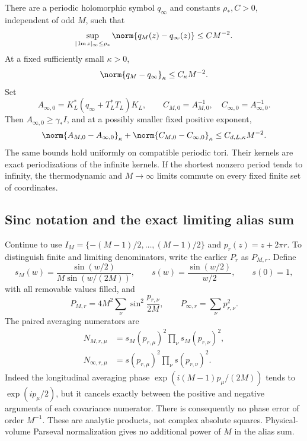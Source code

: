 \begin{theorem}\label{limit-theorem}
There are a periodic holomorphic symbol $q_\infty$ and constants
$\rho_*,C>0$, independent of odd $M$, such that
\begin{equation}\label{limit-symbol-rate}
 \sup_{|\operatorname{Im}z|_\infty\le\rho_*}
       \norm{q_M(z)-q_\infty(z)}\le CM^{-2}.
\end{equation}
At a fixed sufficiently small $\kappa>0$,
\begin{equation}\label{limit-action-rate}
 \norm{q_M-q_\infty}_\kappa\le C_\kappa M^{-2}.
\end{equation}
Set
\[
 A_{\infty,0}=K_L^*(q_\infty+T_L^*T_L)K_L,
 \qquad C_{M,0}=A_{M,0}^{-1},\quad
 C_{\infty,0}=A_{\infty,0}^{-1}.
\]
Then $A_{\infty,0}\ge\gamma_*I$, and at a possibly smaller fixed
positive exponent,
\begin{equation}\label{limit-covariance-rate}
 \norm{A_{M,0}-A_{\infty,0}}_\kappa+
 \norm{C_{M,0}-C_{\infty,0}}_\kappa
 \le C_{d,L,\kappa}M^{-2}.
\end{equation}
The same bounds hold uniformly on compatible periodic tori. Their
kernels are exact periodizations of the infinite kernels. If the
shortest nonzero period tends to infinity, the thermodynamic and
$M\to\infty$ limits commute on every fixed finite set of coordinates.
\end{theorem}

\subsection{Sinc notation and the exact limiting alias sum}

Continue to use $I_M=\{-(M-1)/2,\ldots,(M-1)/2\}$ and
$p_r(z)=z+2\pi r$. To distinguish finite and limiting denominators,
write the earlier $P_r$ as $P_{M,r}$. Define
\begin{equation}\label{limit-sinc}
 s_M(w)=\frac{\sin(w/2)}{M\sin(w/(2M))},\qquad
 s(w)=\frac{\sin(w/2)}{w/2},\qquad s(0)=1,
\end{equation}
with all removable values filled, and
\begin{equation}\label{limit-denominators}
 P_{M,r}=4M^2\sum_\nu\sin^2\frac{p_{r,\nu}}{2M},
 \qquad P_{\infty,r}=\sum_\nu p_{r,\nu}^2.
\end{equation}
The paired averaging numerators are
\begin{align}
 N_{M,r,\mu}
 &=s_M(p_{r,\mu})^2\prod_\nu s_M(p_{r,\nu})^2,
 \label{limit-numerator-finite}\\
 N_{\infty,r,\mu}
 &=s(p_{r,\mu})^2\prod_\nu s(p_{r,\nu})^2.
 \label{limit-numerator-infinite}
\end{align}
Indeed the longitudinal averaging phase
$\exp(i(M-1)p_\mu/(2M))$ tends to $\exp(ip_\mu/2)$, but it
cancels exactly between the positive and negative arguments of each
covariance numerator. There is consequently no phase error of order
$M^{-1}$. These are analytic products, not complex absolute squares.
Physical-volume Parseval normalization gives no additional power of
$M$ in the alias sum.

